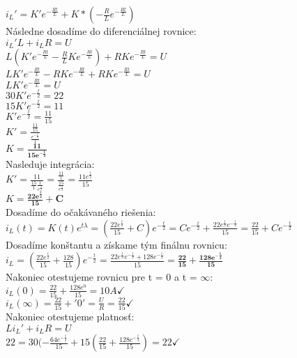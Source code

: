 $i_L' = K'e^{-\frac{Rt}{L}} + K*(-\frac{R}{L}e^{-\frac{Rt}{L}})$ \\
\newline
Následne dosadíme do diferenciálnej rovnice: \\
$i_L'L + i_LR = U$ \\
$L(K'e^{-\frac{Rt}{L}} - \frac{R}{L}Ke^{-\frac{Rt}{L}}) + RKe^{-\frac{Rt}{L}} = U$ \\
$LK'e^{-\frac{Rt}{L}} - RKe^{-\frac{Rt}{L}} + RKe^{-\frac{Rt}{L}} = U$ \\
$LK'e^{-\frac{Rt}{L}} = U$ \\
$30K'e^{-\frac{t}{2}} = 22$ \\
$15K'e^{-\frac{t}{2}} = 11$ \\
$K'e^{-\frac{t}{2}} = \frac{11}{15}$ \\
$K' = \frac{\frac{11}{15}}{\frac{e^{-\frac{t}{2}}}{1}}$ \\
$K = \boldsymbol{\frac{11}{15e^{-\frac{t}{2}}}}$ \\
\newline
Nasleduje integrácia: \\
$K' = \frac{11}{\frac{15}{1}\frac{1}{e^{\frac{t}{2}}}} = \frac{\frac{11}{1}}{\frac{15}{e^{\frac{t}{2}}}} = \frac{11e^{\frac{t}{2}}}{15}$ \\
$K = \boldsymbol{\frac{22e^{\frac{t}{2}}}{15} + C}$ \\
\newline
Dosadíme do očakávaného riešenia: \\
$i_L(t) = K(t)e^{t\lambda} = (\frac{22e^{\frac{t}{2}}}{15} + C)e^{-\frac{t}{2}} = Ce^{-\frac{t}{2}} + \frac{22e^{\frac{t}{2}}e^{-\frac{t}{2}}}{15} = \frac{22}{15} + Ce^{-\frac{t}{2}}$ \\
\newline
Dosadíme konštantu a získame tým finálnu rovnicu: \\
$i_L = (\frac{22e^{\frac{t}{2}}}{15} + \frac{128}{15})e^{-\frac{t}{2}} = \frac{22e^{\frac{t}{2}}e^{-\frac{t}{2}}+128e^{-\frac{t}{2}}}{15} = \boldsymbol{\frac{22}{15} + \frac{128e^{-\frac{t}{2}}}{15}}$ \\
\newline
\newline
Nakoniec otestujeme rovnicu pre t = 0 a t = $\infty$: \\
$i_L(0) = \frac{22}{15} + \frac{128e^0}{15} = 10A \checkmark$ \\
$i_L(\infty) = \frac{22}{15} + '0' = \frac{U}{R} = \frac{22}{15} \checkmark$ \\
\newline
Nakoniec otestujeme platnosť: \\
$Li_L' + i_LR = U$ \\
$22 = 30(-\frac{64e^{-\frac{t}{2}}}{15} + 15(\frac{22}{15} + \frac{128e^{-\frac{t}{2}}}{15}) = 22 \checkmark$ \\